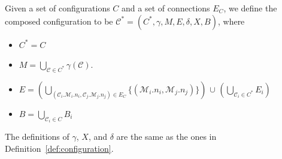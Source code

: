 \documentclass[conference]{IEEEtran}
\theoremstyle{definition}
\begin{document}
Given a set of configurations $C$ %
and a set of connections $E_C$, we define the composed configuration to be $\mathcal{C}^*=(C^*, \gamma, M, E, \delta,
X, B)$, where
\begin{itemize}
\item $C^*=C$
\item $M=\bigcup_{\mathcal{C}\in C^*}{\gamma(\mathcal{C})}$.
\item $E= (\bigcup_{(\mathcal{C}_i.\mathcal{M}_i.n_i, \mathcal{C}_j.\mathcal{M}_j.n_j)\in E_C}{\{(\mathcal{M}_i.n_i, \mathcal{M}_j.n_j)}\})$ $\cup$ $(\bigcup_{\mathcal{C}_i \in C^*}{E_{i}})$
\item \(B = \bigcup_{\mathcal{C}_i \in C} B_i\)
\end{itemize}
The definitions of $\gamma$, \(X\), and $\delta$ are the same as the ones in Definition~\ref{def:configuration}.
% 
% 
\end{document}
